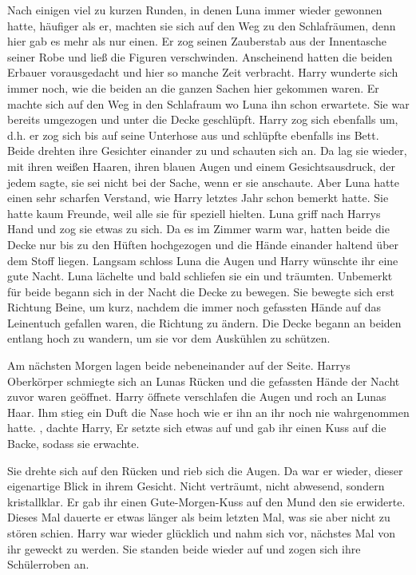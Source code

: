 Nach einigen viel zu kurzen Runden, in denen Luna immer wieder gewonnen hatte, häufiger als er, machten sie sich auf den Weg zu den Schlafräumen, denn hier gab es mehr als nur einen. Er zog seinen Zauberstab aus der Innentasche seiner Robe und ließ die Figuren verschwinden. Anscheinend hatten die beiden Erbauer vorausgedacht und hier so manche Zeit verbracht. Harry wunderte sich immer noch, wie die beiden an die ganzen Sachen hier gekommen waren. Er machte sich auf den Weg in den Schlafraum wo Luna ihn schon erwartete. Sie war bereits umgezogen und unter die Decke geschlüpft. Harry zog sich ebenfalls um, d.h. er zog sich bis auf seine Unterhose aus und schlüpfte ebenfalls ins Bett. Beide drehten ihre Gesichter einander zu und schauten sich an. Da lag sie wieder, mit ihren weißen Haaren, ihren blauen Augen und einem Gesichtsausdruck, der jedem sagte, sie sei nicht bei der Sache, wenn er sie anschaute. Aber Luna hatte einen sehr scharfen Verstand, wie Harry letztes Jahr schon bemerkt hatte. Sie hatte kaum Freunde, weil alle sie für \gst {} \gst speziell hielten. Luna griff nach Harrys Hand und zog sie etwas zu sich. Da es im Zimmer warm war, hatten beide die Decke nur bis zu den Hüften hochgezogen und die Hände einander haltend über dem Stoff liegen. Langsam schloss Luna die Augen und Harry wünschte ihr eine gute Nacht. Luna lächelte und bald schliefen sie ein und träumten. Unbemerkt für beide begann sich in der Nacht die Decke zu bewegen. Sie bewegte sich erst Richtung Beine, um kurz, nachdem die immer noch gefassten Hände auf das Leinentuch gefallen waren, die Richtung zu ändern. Die Decke begann an beiden entlang hoch zu wandern, um sie vor dem Auskühlen zu schützen.

Am nächsten Morgen lagen beide nebeneinander auf der Seite. Harrys Oberkörper schmiegte sich an Lunas Rücken und die gefassten Hände der Nacht zuvor waren geöffnet. Harry öffnete verschlafen die Augen und roch an Lunas Haar. Ihm stieg ein Duft die Nase hoch wie er ihn an ihr noch nie wahrgenommen hatte. , dachte Harry,  Er setzte sich etwas auf und gab ihr einen Kuss auf die Backe, sodass sie erwachte.

Sie drehte sich auf den Rücken und rieb sich die Augen. Da war er wieder, dieser eigenartige Blick in ihrem Gesicht. Nicht verträumt, nicht abwesend, sondern kristallklar. Er gab ihr einen Gute-Morgen-Kuss auf den Mund den sie erwiderte. Dieses Mal dauerte er etwas länger als beim letzten Mal, was sie aber nicht zu stören schien. Harry war wieder glücklich und nahm sich vor, nächstes Mal von ihr geweckt zu werden. Sie standen beide wieder auf und zogen sich ihre Schülerroben an.

